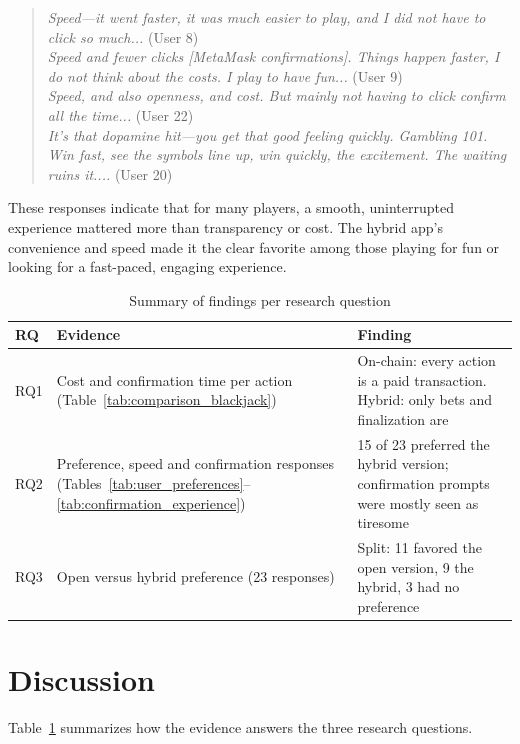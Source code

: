 \documentclass[10pt,conference]{IEEEtran}
\begin{document}
\begin{quote}
\textit{Speed—it went faster, it was much easier to play, and I did not have to click so much...} (User 8) \\
\textit{Speed and fewer clicks [MetaMask confirmations]. Things happen faster, I do not think about the costs. I play to have fun...} (User 9) \\
\textit{Speed, and also openness, and cost. But mainly not having to click confirm all the time...} (User 22) \\
\textit{It’s that dopamine hit—you get that good feeling quickly. Gambling 101. Win fast, see the symbols line up, win quickly, the excitement. The waiting ruins it....} (User 20)
\end{quote}

These responses indicate that for many players, a smooth, uninterrupted experience mattered more than transparency or cost. The hybrid app’s convenience and speed made it the clear favorite among those playing for fun or looking for a fast-paced, engaging experience.

\begin{table}[htbp]
\centering
\caption{Summary of findings per research question}
\label{tab:rq_summary}
\begin{tabular}{p{0.7cm}p{3.35cm}p{3.35cm}}
\hline
\textbf{RQ} & \textbf{Evidence} & \textbf{Finding} \\
\hline
RQ1 & Cost and confirmation time per action (Table~\ref{tab:comparison_blackjack}) & On-chain: every action is a paid transaction. Hybrid: only bets and finalization are \\
RQ2 & Preference, speed and confirmation responses (Tables~\ref{tab:user_preferences}--\ref{tab:confirmation_experience}) & 15 of 23 preferred the hybrid version; confirmation prompts were mostly seen as tiresome \\
RQ3 & Open versus hybrid preference (23 responses) & Split: 11 favored the open version, 9 the hybrid, 3 had no preference \\
\hline
\end{tabular}
\end{table}

\section{Discussion}\label{sec:discussion}
Table~\ref{tab:rq_summary} summarizes how the evidence answers the three research questions.
\end{document}
